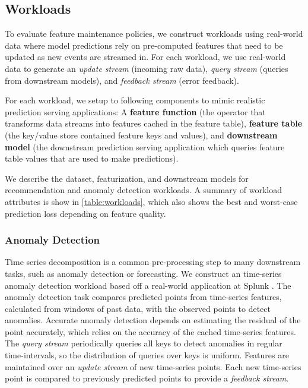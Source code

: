 \subsection{Workloads} 
\label{ss:workloads}

\label{ss:evaluation:workloads}
To evaluate feature maintenance policies, we construct workloads using real-world data where model predictions rely on pre-computed features that need to be updated as new events are streamed in. For each workload, we use real-world data to generate an \textit{update stream} (incoming raw data),  \textit{query stream} (queries from downstream models), and \textit{feedback stream} (error feedback). 

For each workload, we setup to following components to mimic realistic prediction serving applications: A  \textbf{feature function} (the operator that transforms data streams into features cached in the feature table), \textbf{feature table} (the key/value store contained feature keys and values), and \textbf{downstream model} (the downstream prediction serving application which queries feature table values that are used to make predictions). 

We describe the dataset, featurization, and downstream models for recommendation and anomaly detection workloads. A summary of workload attributes is show in \cref{table:workloads}, which also shows the best and worst-case prediction loss depending on feature quality. 


\subsubsection{Anomaly Detection}


Time series decomposition is a common pre-processing step to many downstream tasks, such as anomaly detection or forecasting. We construct an time-series anomaly detection workload based off a real-world application at Splunk \cite{wang2021online,mishra2021onlinestl}. The anomaly detection task compares predicted points from time-series features, calculated from windows of past data, with the observed points to detect anomalies. Accurate anomaly detection depends on estimating the residual of the point accurately, which relies on the accuracy of the cached time-series features. The \textit{query stream} periodically queries all keys to detect anomalies in regular time-intervals, so the distribution of queries over keys is uniform. Features are maintained over an \textit{update stream} of new time-series points. Each new time-series point is compared to previously predicted points to provide a \textit{feedback stream}.

